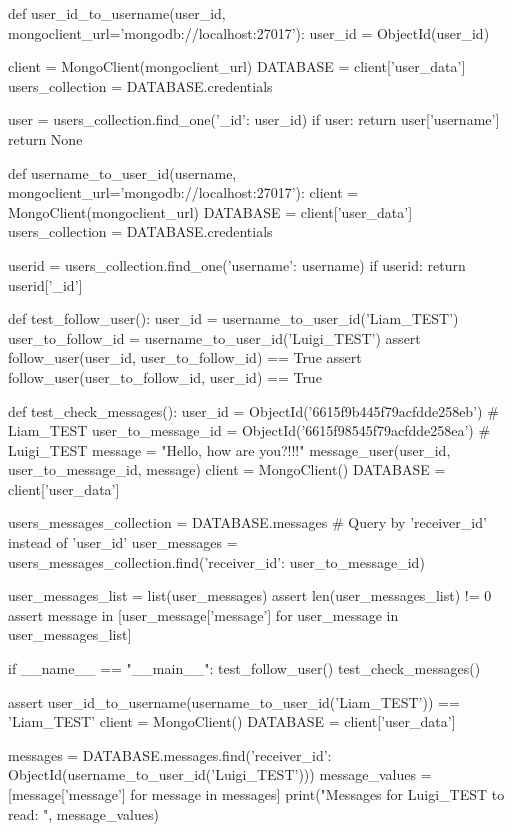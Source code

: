 \documentclass[12pt]{article} %
\begin{document}
\begin{pythoncode}[caption={Messaging Functions for MongoDB}]
    def user_id_to_username(user_id, mongoclient_url='mongodb://localhost:27017'):
        user_id = ObjectId(user_id)
        
        client = MongoClient(mongoclient_url)
        DATABASE = client['user_data']
        users_collection = DATABASE.credentials
        
        user = users_collection.find_one({'_id': user_id})
        if user:
            return user['username']
        return None
    
    def username_to_user_id(username, mongoclient_url='mongodb://localhost:27017'):
        client = MongoClient(mongoclient_url)
        DATABASE = client['user_data']
        users_collection = DATABASE.credentials
        
        userid = users_collection.find_one({'username': username})
        if userid:
            return userid['_id']
    
    
    def test_follow_user():
        user_id = username_to_user_id('Liam_TEST')
        user_to_follow_id = username_to_user_id('Luigi_TEST')
        assert follow_user(user_id, user_to_follow_id) == True
        assert follow_user(user_to_follow_id, user_id) == True
    
    
    def test_check_messages():
        user_id = ObjectId('6615f9b445f79acfdde258eb')  # Liam_TEST
        user_to_message_id = ObjectId('6615f98545f79acfdde258ea')  # Luigi_TEST
        message = "Hello, how are you?!!!"
        message_user(user_id, user_to_message_id, message)
        client = MongoClient()
        DATABASE = client['user_data']
        
        users_messages_collection = DATABASE.messages
        # Query by 'receiver_id' instead of 'user_id'
        user_messages = users_messages_collection.find({'receiver_id': user_to_message_id})
        
        user_messages_list = list(user_messages)
        assert len(user_messages_list) != 0
        assert message in [user_message['message'] for user_message in user_messages_list]
        
    
    if __name__ == "__main__":
        test_follow_user()
        test_check_messages()
        
    
        assert user_id_to_username(username_to_user_id('Liam_TEST')) == 'Liam_TEST'
        client = MongoClient()
        DATABASE = client['user_data']
        
        messages = DATABASE.messages.find({'receiver_id': ObjectId(username_to_user_id('Luigi_TEST'))})
        message_values = [message['message'] for message in messages]
        print("Messages for Luigi_TEST to read: ", message_values)
    

\end{pythoncode}
\end{document}

